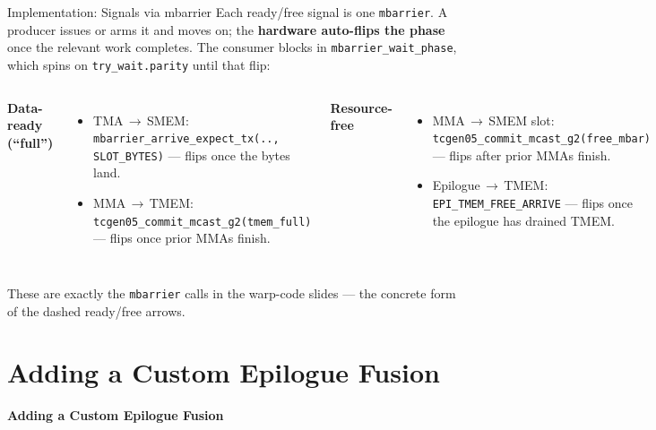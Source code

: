 \documentclass[aspectratio=169,professionalfonts]{beamer}
\newcommand{\code}[1]{\texttt{#1}}
\newcommand{\sectionslide}[2]{%
  \begin{frame}[plain]
    \begin{center}
      \vspace{1.8cm}
      \hypertarget{#1}{}%
      {\usebeamercolor[fg]{title}\Large\bfseries #2}
    \end{center}
  \end{frame}%
}
\begin{document}
\begin{frame}{Implementation: Signals via mbarrier}
  Each ready/free signal is one \code{mbarrier}. A producer issues or arms it and
  moves on; the \textbf{hardware auto-flips the phase} once the relevant work
  completes. The consumer blocks in \code{mbarrier\_wait\_phase}, which spins on
  \code{try\_wait.parity} until that flip:

  \vspace{0.15cm}
  \begin{columns}[T,onlytextwidth]
    \textbf{Data-ready (``full'')}
    \begin{itemize}
      \item TMA\,$\to$\,SMEM: \code{mbarrier\_arrive\_expect\_tx(.., SLOT\_BYTES)}
        --- flips once the bytes land.
      \item MMA\,$\to$\,TMEM: \code{tcgen05\_commit\_mcast\_g2(tmem\_full)} ---
        flips once prior MMAs finish.
    \end{itemize}

    \textbf{Resource-free}
    \begin{itemize}
      \item MMA\,$\to$\,SMEM slot: \code{tcgen05\_commit\_mcast\_g2(free\_mbar)}
        --- flips after prior MMAs finish.
      \item Epilogue\,$\to$\,TMEM: \code{EPI\_TMEM\_FREE\_ARRIVE} --- flips once
        the epilogue has drained TMEM.
    \end{itemize}
  \end{columns}

  \vspace{0.1cm}
  \footnotesize These are exactly the \code{mbarrier} calls in the warp-code
  slides --- the concrete form of the dashed ready/free arrows.
\end{frame}

\section{Adding a Custom Epilogue Fusion}
\sectionslide{toc:fusion}{Adding a Custom Epilogue Fusion}
\end{document}
